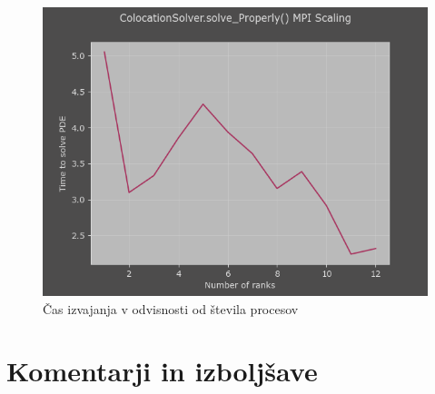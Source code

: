 \documentclass[a4paper]{article}
\begin{document}
\begin{figure}[H]
    \centering
        \includegraphics[width=\linewidth]{./images/C_Proper_MPI_scaling.png}
        \caption{Čas izvajanja v odvisnosti od števila procesov}
\label{fig:12}
\end{figure}



\section{Komentarji in izboljšave}

\newpage


\end{document}
